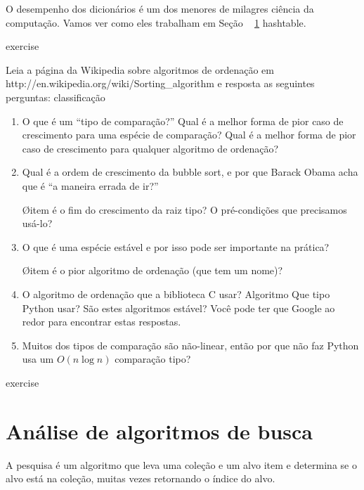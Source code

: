 \documentclass[10pt]{book}
\begin{document}
\begin{exercise}
\begin{v erbatim}
O desempenho dos dicionários é um dos menores de milagres
ciência da computação. Vamos ver como eles trabalham em
Seção ~ \ref {} hashtable.


\begin{} exercise

Leia a página da Wikipedia sobre algoritmos de ordenação em
\url{} http://en.wikipedia.org/wiki/Sorting_algorithm e resposta
as seguintes perguntas:
\index{} classificação

\begin{enumerate}

\item O que é um ``tipo de comparação?'' Qual é a melhor forma de pior caso
  de crescimento para uma espécie de comparação? Qual é a melhor forma de pior caso
  de crescimento para qualquer algoritmo de ordenação?

\item Qual é a ordem de crescimento da bubble sort, e por que Barack
  Obama acha que é ``a maneira errada de ir?''

\O item é o fim do crescimento da raiz tipo? O pré-condições
  que precisamos usá-lo?

\item O que é uma espécie estável e por isso pode ser importante na prática?

\O item é o pior algoritmo de ordenação (que tem um nome)?

\item O algoritmo de ordenação que a biblioteca C usar? Algoritmo Que tipo
  Python usar? São estes algoritmos estável? Você pode ter que
  Google ao redor para encontrar estas respostas.

\item Muitos dos tipos de comparação são não-linear, então por que não faz
  Python usa um $ O (n \log n) $ comparação tipo?

\end{enumerate}

\end{} exercise


\section{Análise de algoritmos de busca}

A pesquisa {\bf} é um algoritmo que leva uma coleção e um alvo
item e determina se o alvo está na coleção, muitas vezes
retornando o índice do alvo.


\end{v erbatim}
\end{exercise}
\end{document}

